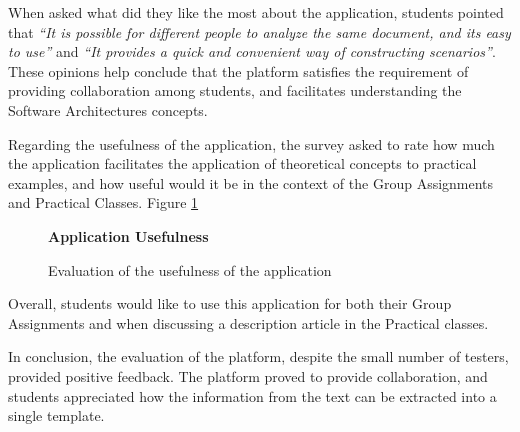 When asked what did they like the most about the application, students pointed that \textit{``It is possible for different people to analyze the same document, and its easy to use''} and \textit{``It provides a quick and convenient way of constructing scenarios''}. These opinions help conclude that the platform satisfies the requirement of providing collaboration among students, and facilitates understanding the Software Architectures concepts.

Regarding the usefulness of the application, the survey asked to rate how much the application facilitates the application of theoretical concepts to practical examples, and how useful would it be in the context of the Group Assignments and Practical Classes. Figure \ref{figure:usefulnessEvaluation}

\begin{figure}[h]
\centering
\begin{normalsize}
\textbf{Application Usefulness}\\
\end{normalsize}
\scriptsize
{}
\caption{Evaluation of the usefulness of the application}
\label{figure:usefulnessEvaluation}
\end{figure}

Overall, students would like to use this application for both their Group Assignments and when discussing a description article in the Practical classes. 

In conclusion, the evaluation of the platform, despite the small number of testers, provided positive feedback. The platform proved to provide collaboration, and students appreciated how the information from the text can be extracted into a single template. 
